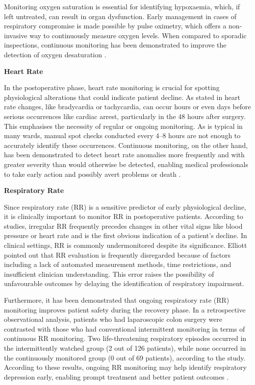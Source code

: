 Monitoring oxygen saturation is essential for identifying hypoxaemia, which, if left untreated, can result in organ dysfunction. Early management in cases of respiratory compromise is made possible by pulse oximetry, which offers a non-invasive way to continuously measure oxygen levels. When compared to sporadic inspections, continuous monitoring has been demonstrated to improve the detection of oxygen desaturation \cite{Khanna2024_fz}.

\textbf{Heart Rate}

In the postoperative phase, heart rate monitoring is crucial for spotting physiological alterations that could indicate patient decline. As stated in \cite{Khanna2025_sg} heart rate changes, like bradycardia or tachycardia, can occur hours or even days before serious occurrences like cardiac arrest, particularly in the 48 hours after surgery. This emphasises the necessity of regular or ongoing monitoring. As is typical in many wards, manual spot checks conducted every 4–8 hours are not enough to accurately identify these occurrences. Continuous monitoring, on the other hand, has been demonstrated to detect heart rate anomalies more frequently and with greater severity than would otherwise be detected, enabling medical professionals to take early action and possibly avert problems or death \cite{Khanna2025_sg}.

\textbf{Respiratory Rate}

Since respiratory rate (RR) is a sensitive predictor of early physiological decline, it is clinically important to monitor RR in postoperative patients. According to studies, irregular RR frequently precedes changes in other vital signs like blood pressure or heart rate and is the first obvious indication of a patient's decline. In clinical settings, RR is commonly undermonitored despite its significance. Elliott \cite{Elliot2016Respiratory} pointed out that RR evaluation is frequently disregarded because of factors including a lack of automated measurement methods, time restrictions, and insufficient clinician understanding. This error raises the possibility of unfavourable outcomes by delaying the identification of respiratory impairment.

Furthermore, it has been demonstrated that ongoing respiratory rate (RR) monitoring improves patient safety during the recovery phase. In a retrospective observational analysis, patients who had laparoscopic colon surgery were contrasted with those who had conventional intermittent monitoring in terms of continuous RR monitoring. Two life-threatening respiratory episodes occurred in the intermittently watched group (2 out of 126 patients), while none occurred in the continuously monitored group (0 out of 69 patients), according to the study. According to these results, ongoing RR monitoring may help identify respiratory depression early, enabling prompt treatment and better patient outcomes \cite{Kawanishi2017Incidence}.

